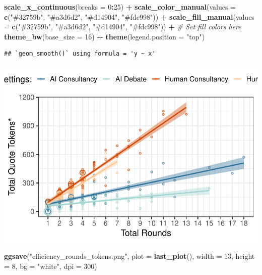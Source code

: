 \documentclass[
]{article}
\newenvironment{Shaded}{\begin{snugshade}}{\end{snugshade}}
\newcommand{\AttributeTok}[1]{\textcolor[rgb]{0.13,0.29,0.53}{#1}}
\newcommand{\CommentTok}[1]{\textcolor[rgb]{0.56,0.35,0.01}{\textit{#1}}}
\newcommand{\DecValTok}[1]{\textcolor[rgb]{0.00,0.00,0.81}{#1}}
\newcommand{\FunctionTok}[1]{\textcolor[rgb]{0.13,0.29,0.53}{\textbf{#1}}}
\newcommand{\NormalTok}[1]{#1}
\newcommand{\SpecialCharTok}[1]{\textcolor[rgb]{0.81,0.36,0.00}{\textbf{#1}}}
\newcommand{\StringTok}[1]{\textcolor[rgb]{0.31,0.60,0.02}{#1}}
\begin{document}
\begin{Shaded}
\begin{Highlighting}[]
  \FunctionTok{scale\_x\_continuous}\NormalTok{(}\AttributeTok{breaks =} \DecValTok{0}\SpecialCharTok{:}\DecValTok{25}\NormalTok{) }\SpecialCharTok{+}
  \FunctionTok{scale\_color\_manual}\NormalTok{(}\AttributeTok{values =} \FunctionTok{c}\NormalTok{(}\StringTok{"\#32759b"}\NormalTok{, }\StringTok{"\#a3d6d2"}\NormalTok{, }\StringTok{"\#d14904"}\NormalTok{, }\StringTok{"\#fdc998"}\NormalTok{)) }\SpecialCharTok{+}
  \FunctionTok{scale\_fill\_manual}\NormalTok{(}\AttributeTok{values =} \FunctionTok{c}\NormalTok{(}\StringTok{"\#32759b"}\NormalTok{, }\StringTok{"\#a3d6d2"}\NormalTok{, }\StringTok{"\#d14904"}\NormalTok{, }\StringTok{"\#fdc998"}\NormalTok{)) }\SpecialCharTok{+}  \CommentTok{\# Set fill colors here}
  \FunctionTok{theme\_bw}\NormalTok{(}\AttributeTok{base\_size =} \DecValTok{16}\NormalTok{) }\SpecialCharTok{+}
  \FunctionTok{theme}\NormalTok{(}\AttributeTok{legend.position =} \StringTok{"top"}\NormalTok{)}
\end{Highlighting}
\end{Shaded}

\begin{verbatim}
## `geom_smooth()` using formula = 'y ~ x'
\end{verbatim}

\includegraphics[width=1\linewidth]{debate-2309_files/figure-latex/rounds graph-4}

\begin{Shaded}
\begin{Highlighting}[]
\FunctionTok{ggsave}\NormalTok{(}\StringTok{"efficiency\_rounds\_tokens.png"}\NormalTok{, }\AttributeTok{plot =} \FunctionTok{last\_plot}\NormalTok{(), }\AttributeTok{width =} \DecValTok{13}\NormalTok{, }\AttributeTok{height =} \DecValTok{8}\NormalTok{, }\AttributeTok{bg =} \StringTok{"white"}\NormalTok{, }\AttributeTok{dpi =} \DecValTok{300}\NormalTok{)}
\end{Highlighting}
\end{Shaded}
\end{document}
